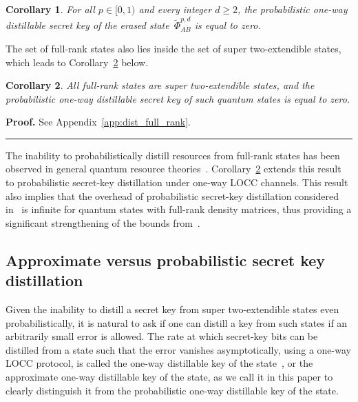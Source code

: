 \documentclass[twocolumn,letterpaper, dvipsnames,allowtoday, accepted = 2025-12-31]{quantumarticle}
\newtheorem{corollary}{Corollary}
\newenvironment{proof}[1][Proof]{\noindent\textbf{#1.} }{\ \rule{0.5em}{0.5em}}
\begin{document}
\begin{corollary}
\label{cor:prob_distill_eras_st_eq_0}
    For all $p \in [0,1)$ and every integer $d \geq 2$, the probabilistic one-way distillable secret key of the erased state~$\widetilde{\Phi}^{p,d}_{AB}$ is equal to zero.
\end{corollary}


The set of full-rank states also lies inside the set of super two-extendible states, which leads to  Corollary~\ref{cor:dist_full_rank} below.

\begin{corollary}\label{cor:dist_full_rank}
    All full-rank states are super two-extendible states, and the probabilistic one-way distillable secret key of such quantum states is equal to zero.
\end{corollary}

\begin{proof}
    See Appendix~\ref{app:dist_full_rank}.
\end{proof}

\medskip

The inability to probabilistically distill resources from full-rank states has been observed in general quantum resource theories~\cite{Kent98, FL20, Regula22b}. Corollary~\ref{cor:dist_full_rank} extends this result to probabilistic secret-key distillation under one-way LOCC channels. This result also implies that the overhead of probabilistic secret-key distillation considered in~\cite[Sec.~V-B]{WWW21} is infinite for quantum states with full-rank density matrices, thus providing a significant strengthening of the bounds from~\cite[Sec.~V-B]{WWW21}.

\subsection{Approximate versus probabilistic secret key distillation}

Given the inability to distill a secret key from super two-extendible states even probabilistically, it is natural to ask if one can distill a key from such states if an arbitrarily small error is allowed. The rate at which secret-key bits can be distilled from a state such that the error vanishes asymptotically, using a one-way LOCC protocol, is called the one-way distillable key of the state~\cite{DW2005}, or the approximate one-way distillable key of the state, as we call it in this paper to clearly distinguish it from the probabilistic one-way distillable key of the state.
\end{document}
